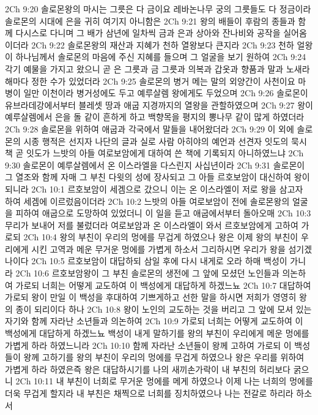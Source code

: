 2Ch 9:20  솔로몬왕의 마시는 그릇은 다 금이요 레바논나무 궁의 그릇들도 다 정금이라 솔로몬의 시대에 은을 귀히 여기지 아니함은
2Ch 9:21  왕의 배들이 후람의 종들과 함께 다시스로 다니며 그 배가 삼년에 일차씩 금과 은과 상아와 잔나비와 공작을 실어옴이더라
2Ch 9:22  솔로몬왕의 재산과 지혜가 천하 열왕보다 큰지라
2Ch 9:23  천하 얼왕이 하나님께서 솔로몬의 마음에 주신 지혜를 들으며 그 얼굴을 보기 원하여
2Ch 9:24  각기 예물을 가지고 왔으니 곧 은 그릇과 금 그릇과 의복과 갑옷과 향품과 말과 노새라 해마다 정한 수가 있었더라
2Ch 9:25  솔로몬의 병거 메는 말의 외양간이 사천이요 마병이 일만 이천이라 병거성에도 두고 예루살렘 왕에게도 두었으며
2Ch 9:26  솔로몬이 유브라데강에서부터 블레셋 땅과 애굽 지경까지의 열왕을 관할하였으며
2Ch 9:27  왕이 예루살렘에서 은을 돌 같이 흔하게 하고 백향목을 평지의 뽕나무 같이 많게 하였더라
2Ch 9:28  솔로몬을 위하여 애굽과 각국에서 말들을 내어왔더라
2Ch 9:29  이 외에 솔로몬의 시종 행적은 선지자 나단의 글과 실로 사람 아히야의 예언과 선견자 잇도의 묵시 책 곧 잇도가 느밧의 아들 여로보암에게 대하여 쓴 책에 기록되지 아니하였느냐
2Ch 9:30  솔로몬이 예루살렘에서 온 이스라엘을 다스린지 사십년이라
2Ch 9:31  솔로몬이 그 열조와 함께 자매 그 부친 다윗의 성에 장사되고 그 아들 르호보암이 대신하여 왕이 되니라
2Ch 10:1  르호보암이 세겜으로 갔으니 이는 온 이스라엘이 저로 왕을 삼고자 하여 세겜에 이르렀음이더라
2Ch 10:2  느밧의 아들 여로보암이 전에 솔로몬왕의 얼굴을 피하여 애굽으로 도망하여 있었더니 이 일을 듣고 애굽에서부터 돌아오매
2Ch 10:3  무리가 보내어 저를 불렀더라 여로보암과 온 이스라엘이 와서 르호보암에게 고하여 가로되
2Ch 10:4  왕의 부친이 우리의 멍에를 무겁게 하였으나 왕은 이제 왕의 부친이 우리에게 시킨 고역과 메운 무거운 멍에를 가볍게 하소서 그리하시면 우리가 왕을 섬기겠나이다
2Ch 10:5  르호보암이 대답하되 삼일 후에 다시 내게로 오라 하매 백성이 가니라
2Ch 10:6  르호보암왕이 그 부친 솔로몬의 생전에 그 앞에 모셨던 노인들과 의논하여 가로되 너희는 어떻게 교도하여 이 백성에게 대답하게 하겠느뇨
2Ch 10:7  대답하여 가로되 왕이 만일 이 백성을 후대하여 기쁘게하고 선한 말을 하시면 저희가 영영히 왕의 종이 되리이다 하나
2Ch 10:8  왕이 노인의 교도하는 것을 버리고 그 앞에 모셔 있는 자기와 함께 자라난 소년들과 의논하여
2Ch 10:9  가로되 너희는 어떻게 교도하여 이 백성에게 대답하게 하겠느뇨 백성이 내게 말하기를 왕의 부친이 우리에게 메운 멍에를 가볍게 하라 하였느니라
2Ch 10:10  함께 자라난 소년들이 왕께 고하여 가로되 이 백성들이 왕께 고하기를 왕의 부친이 우리의 멍에를 무겁게 하였으나 왕은 우리를 위하여 가볍게 하라 하였은즉 왕은 대답하시기를 나의 새끼손가락이 내 부친의 허리보다 굵으니
2Ch 10:11  내 부친이 너희로 무거운 멍에를 메게 하였으나 이제 나는 너희의 멍에를 더욱 무겁게 할지라 내 부친은 채찍으로 너희를 징치하였으나 나는 전갈로 하리라 하소서
